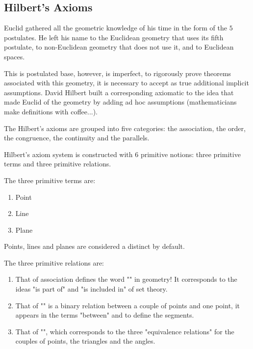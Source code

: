 	\pagebreak
	\subsection{Hilbert's Axioms}\label{hilbert axioms}
	Euclid gathered all the geometric knowledge of his time in the form of the $5$ postulates. He left his name to the Euclidean geometry that uses its fifth postulate, to non-Euclidean geometry that does not use it, and to Euclidean spaces.

	This is postulated base, however, is imperfect, to rigorously prove theorems associated with this geometry, it is necessary to accept as true additional implicit assumptions. David Hilbert built a corresponding axiomatic to the idea that made Euclid  of the geometry by adding ad hoc assumptions (mathematicians make definitions with coffee...).

	The Hilbert's axioms are grouped into five categories: the association, the order, the congruence, the continuity and the parallels.

	Hilbert's axiom system is constructed with $6$ primitive notions: three primitive terms and three primitive relations.

	The three primitive terms are:
	\begin{enumerate}
		\item Point
		\item Line
		\item Plane
	\end{enumerate}
	\begin{tcolorbox}[title=Remark,colframe=black,arc=10pt]
	Points, lines and planes are considered a distinct by default.
	\end{tcolorbox}
	The three primitive relations are:
	\begin{enumerate}
		\item That of association defines the word "" in geometry! It corresponds to the ideas "is part of" and "is included in" of set theory.

		\item That of "" is a binary relation between a couple of points and one point, it appears in the terms "between" and to define the segments.

		\item That of "", which corresponds to the three "equivalence relations" for the couples of points, the triangles and the angles.
	\end{enumerate}

